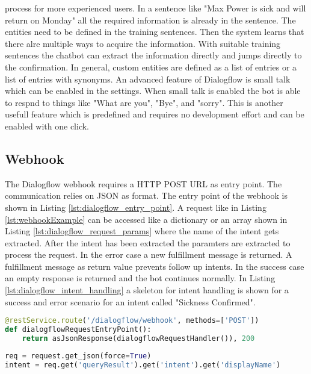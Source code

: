 process for more experienced users.
In a sentence like "Max Power is sick and will return on Monday" all the required information is 
already in the sentence. 
The entities need to be defined in the training sentences.
Then the system learns that there alre multiple ways to acquire the information.
With suitable training sentences the chatbot can extract the information 
directly and jumps directly to the confirmation.  
In general, custom entities are defined as a list of entries or a list of entries with 
synonyms.
An advanced feature of Dialogflow is small talk which can be enabled in the settings.
When small talk is enabled the bot is able to respnd to things like "What are you",
"Bye", and "sorry".
This is another usefull feature which is predefined and requires no development effort
and can be enabled with one click. 

\subsection{Webhook}
The Dialogflow webhook requires a HTTP POST URL as entry point.
The communication relies on JSON as format.
The entry point of the webhook is shown in Listing \ref{lst:dialogflow_entry_point}.
A request like in Listing \ref{lst:webhookExample} can be accessed like a dictionary or 
an array shown in Listing \ref{lst:dialogflow_request_params} where the name of the 
intent gets extracted. 
After the intent has been extracted the paramters are extracted to process the request.
In the error case a new fulfillment message is returned.
A fulfillment message as return value prevents follow up intents.
In the success case an empty response is returned and the bot continues normally.
In Listing \ref{lst:dialogflow_intent_handling} a skeleton for intent handling
is shown for a success and error scenario for an intent called "Sickness Confirmed".

\begin{lstlisting}[caption={Dialogflow Webhook Entry Point}, label={lst:dialogflow_entry_point},captionpos=b,frame=single,language={Python},commentstyle=\color{mygreen},keywordstyle=\color{blue},
    morekeywords={}]                
@restService.route('/dialogflow/webhook', methods=['POST'])
def dialogflowRequestEntryPoint():
    return asJsonResponse(dialogflowRequestHandler()), 200
\end{lstlisting}  

\begin{lstlisting}[caption={Dialogflow Request Parameters}, label={lst:dialogflow_request_params},captionpos=b,frame=single,language={Python},commentstyle=\color{mygreen},keywordstyle=\color{blue},
    morekeywords={}]                
req = request.get_json(force=True)
intent = req.get('queryResult').get('intent').get('displayName')
\end{lstlisting}  

